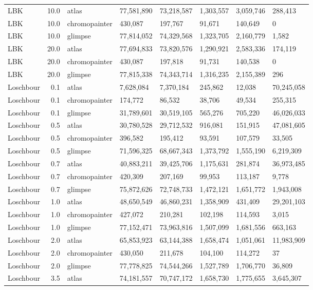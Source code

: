 {\begin{longtable}[t]{lrllllll}
LBK & 10.0 & atlas & 77,581,890 & 73,218,587 & 1,303,557 & 3,059,746 & 288,413\\
LBK & 10.0 & chromopainter & 430,087 & 197,767 & 91,671 & 140,649 & 0\\
LBK & 10.0 & glimpse & 77,814,052 & 74,329,568 & 1,323,705 & 2,160,779 & 1,582\\
LBK & 20.0 & atlas & 77,694,833 & 73,820,576 & 1,290,921 & 2,583,336 & 174,119\\
LBK & 20.0 & chromopainter & 430,087 & 197,818 & 91,731 & 140,538 & 0\\
LBK & 20.0 & glimpse & 77,815,338 & 74,343,714 & 1,316,235 & 2,155,389 & 296\\
Loschbour & 0.1 & atlas & 7,628,084 & 7,370,184 & 245,862 & 12,038 & 70,245,058\\
Loschbour & 0.1 & chromopainter & 174,772 & 86,532 & 38,706 & 49,534 & 255,315\\
Loschbour & 0.1 & glimpse & 31,789,601 & 30,519,105 & 565,276 & 705,220 & 46,026,033\\
Loschbour & 0.5 & atlas & 30,780,528 & 29,712,532 & 916,081 & 151,915 & 47,081,605\\
Loschbour & 0.5 & chromopainter & 396,582 & 195,412 & 93,591 & 107,579 & 33,505\\
Loschbour & 0.5 & glimpse & 71,596,325 & 68,667,343 & 1,373,792 & 1,555,190 & 6,219,309\\
Loschbour & 0.7 & atlas & 40,883,211 & 39,425,706 & 1,175,631 & 281,874 & 36,973,485\\
Loschbour & 0.7 & chromopainter & 420,309 & 207,169 & 99,953 & 113,187 & 9,778\\
Loschbour & 0.7 & glimpse & 75,872,626 & 72,748,733 & 1,472,121 & 1,651,772 & 1,943,008\\
Loschbour & 1.0 & atlas & 48,650,549 & 46,860,231 & 1,358,909 & 431,409 & 29,201,103\\
Loschbour & 1.0 & chromopainter & 427,072 & 210,281 & 102,198 & 114,593 & 3,015\\
Loschbour & 1.0 & glimpse & 77,152,471 & 73,963,816 & 1,507,099 & 1,681,556 & 663,163\\
Loschbour & 2.0 & atlas & 65,853,923 & 63,144,388 & 1,658,474 & 1,051,061 & 11,983,909\\
Loschbour & 2.0 & chromopainter & 430,050 & 211,678 & 104,100 & 114,272 & 37\\
Loschbour & 2.0 & glimpse & 77,778,825 & 74,544,266 & 1,527,789 & 1,706,770 & 36,809\\
Loschbour & 3.5 & atlas & 74,181,557 & 70,747,172 & 1,658,730 & 1,775,655 & 3,645,307\\

\end{longtable}}
